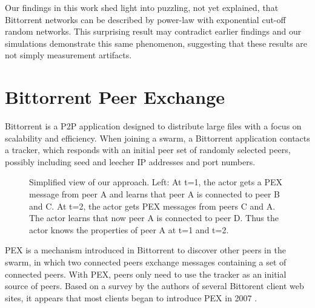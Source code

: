 \documentclass[10pt,conference,letterpaper]{IEEEtran}
\begin{document}
Our findings in this work shed light into puzzling, not yet explained, that  Bittorrent networks can be described by power-law with exponential cut-off random networks.
This surprising result may contradict earlier findings and our simulations demonstrate this same phenomenon, suggesting that these results are not simply measurement artifacts.

\section{Bittorrent Peer Exchange}\label{background}
Bittorrent is a P2P application designed to distribute large files with a focus on scalability and efficiency.  
When joining a swarm, a Bittorrent application contacts a tracker, which responds with an initial peer set of randomly selected peers, possibly including seed and leecher IP addresses and port numbers.  
\begin{figure}
\centering
{}
\caption{Simplified view of our approach. Left: At t=1, the actor gets a PEX message from peer A and
learns that peer A is connected to peer B and C. At t=2, the actor gets  PEX messages from peers C and A. The actor
learns that now peer A is connected to peer D. Thus the actor knows the properties of peer A at t=1 and t=2.} 
\label{fig:pexworks}
\vspace{-2mm}
\end{figure}
PEX is a mechanism introduced in Bittorrent to discover other peers in the swarm, in which two connected peers exchange messages containing a set of connected peers.  
With PEX, peers only need to use the tracker as an initial source of peers.   
Based on a survey by the authors of several Bittorent client web sites, it appears that most clients began to introduce PEX in 2007 \cite{client}.
\end{document}
